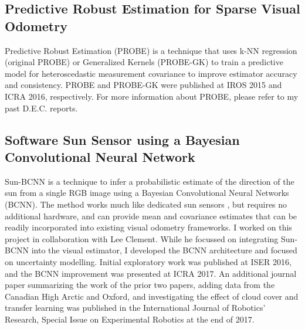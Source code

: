 \subsection{Predictive Robust Estimation for Sparse Visual Odometry}

Predictive Robust Estimation (PROBE) is a technique that uses k-NN regression (original PROBE) or Generalized Kernels \citep{Vega-Brown2014-sb} (PROBE-GK) to train a predictive model for heteroscedastic measurement covariance to improve estimator accuracy and consistency. PROBE \citep{Peretroukhin2015-em} and PROBE-GK \citep{Peretroukhin2016-om} were published at IROS 2015 and ICRA 2016, respectively. For more information about PROBE, please refer to my past D.E.C. reports.

\subsection{Software Sun Sensor using a Bayesian Convolutional Neural Network}
Sun-BCNN is a technique to infer a probabilistic estimate of the direction of the sun from a single RGB image using a Bayesian Convolutional Neural Networks (BCNN). The method works much like dedicated sun sensors \citep{Lambert2012-sn}, but requires no additional hardware, and can provide mean and covariance estimates that can be readily incorporated into existing visual odometry frameworks. I worked on this project in collaboration with Lee Clement. While he focussed on integrating Sun-BCNN into the visual estimator, I developed the BCNN architecture and focused on uncertainty modelling. Initial exploratory work was published at ISER 2016, and the BCNN improvement was presented at ICRA 2017. An additional journal paper summarizing the work of the prior two papers, adding data from the Canadian High Arctic and Oxford, and investigating the effect of cloud cover and transfer learning was published in the International Journal of Robotics' Research, Special Issue on Experimental Robotics at the end of 2017.



